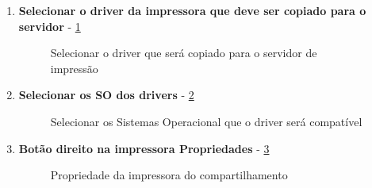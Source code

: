 \begin{enumerate}
	\item \textbf{Selecionar o driver da impressora que deve ser copiado para o servidor} - \ref{selecionar_driver}
	\begin{figure}[ht]
	   	\centering
	   	\caption{Selecionar o driver que será copiado para o servidor de impressão}
	    \label{selecionar_driver}
	\end{figure}
	
	\item \textbf{Selecionar os SO dos drivers} - \ref{selecionar_so}
	\begin{figure}[ht]
	   	\centering
	   	\caption{Selecionar os Sistemas Operacional que o driver será compatível}
	    \label{selecionar_so}
	\end{figure}
	
	\item \textbf{Botão direito na impressora Propriedades} - \ref{propriedade_impressora}
	\begin{figure}[ht]
	   	\centering
	   	\caption{Propriedade da impressora do compartilhamento}
	    \label{propriedade_impressora}
	\end{figure}
	

\end{enumerate}
